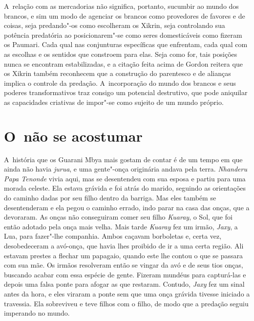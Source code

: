 A~relação com as mercadorias não significa, portanto, sucumbir ao mundo
dos brancos, e sim um modo de agenciar os brancos como provedores de
favores e de coisas, seja predando"-os como escolheram os Xikrin, seja
controlando sua potência predatória ao posicionarem"-se como seres
domesticáveis como fizeram os Paumari. Cada qual nas conjunturas
específicas que enfrentam, cada qual com as escolhas e os sentidos que
constroem para elas. Seja como for, tais posições nunca se encontram
estabilizadas, e a citação feita acima de Gordon reitera que os Xikrin
também reconhecem que a construção do parentesco e de alianças implica
o controle da predação. A~incorporação do mundo dos brancos e seus
poderes transformativos traz consigo um potencial destrutivo, que pode
aniquilar as capacidades criativas de impor"-se como sujeito de um mundo
próprio.

\section{O~não se acostumar}

A~história que os Guarani Mbya mais gostam de contar é de um tempo em
que ainda não havia \emph{jurua}, e uma gente"-onça originária andava pela
terra. \emph{Nhanderu Papa Tenonde} vivia aqui, mas se desentendeu com sua
esposa e partiu para uma morada celeste. Ela estava grávida e foi atrás
do marido, seguindo as orientações do caminho dadas por seu filho
dentro da barriga. Mas eles também se desentenderam e ela pegou o
caminho errado, indo parar na casa das onças, que a devoraram. As onças
não conseguiram comer seu filho \emph{Kuaray}, o Sol, que foi então adotado
pela onça mais velha. Mais tarde \emph{Kuaray} fez um irmão, \emph{Jaxy}, a Lua, para
fazer"-lhe companhia. Ambos caçavam borboletas e, certa vez,
desobedeceram a avó-onça, que havia lhes proibido de ir a uma certa
região. Ali estavam prestes a flechar um papagaio, quando este lhe
contou o que se passara com sua mãe. Os irmãos resolveram então se
vingar da avó e de seus tios onças, buscando acabar com essa espécie de
gente. Fizeram mundéus para capturá-las e depois uma falsa ponte para
afogar as que restaram. Contudo, \emph{Jaxy} fez um sinal antes da hora, e
eles viraram a ponte sem que uma onça grávida tivesse iniciado a
travessia. Ela sobreviveu e teve filhos com o filho, de modo que a
predação seguiu imperando no mundo.


